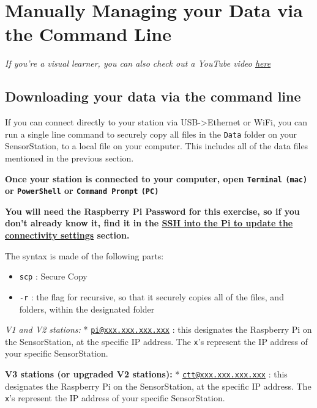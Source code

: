 \documentclass[
]{article}
\providecommand{\tightlist}{%
  \setlength{\itemsep}{0pt}\setlength{\parskip}{0pt}}
\begin{document}
\hypertarget{manually-managing-your-data-via-the-command-line}{%
\section{Manually Managing your Data via the Command
Line}\label{manually-managing-your-data-via-the-command-line}}

\emph{If you're a visual learner, you can also check out a YouTube video
\href{https://www.youtube.com/watch?v=2iG8ZG1UZGA\&t=23s}{here}}

\hypertarget{downloading-your-data-via-the-command-line}{%
\subsection{Downloading your data via the command
line}\label{downloading-your-data-via-the-command-line}}

If you can connect directly to your station via
USB-\textgreater Ethernet or WiFi, you can run a single line command to
securely copy all files in the \texttt{Data} folder on your
SensorStation, to a local file on your computer. This includes all of
the data files mentioned in the previous section.

\textbf{Once your station is connected to your computer, open
\texttt{Terminal} \texttt{(mac)} or \texttt{PowerShell} or
\texttt{Command\ Prompt} \texttt{(PC)}}

\textbf{You will need the Raspberry Pi Password for this exercise, so if
you don't already know it, find it in the
\protect\hyperlink{ssh-into-the-pi-to-update-the-connectivity-settings}{SSH
into the Pi to update the connectivity settings} section.}

The syntax is made of the following parts:

\begin{itemize}
\tightlist
\item
  \texttt{scp} : Secure Copy
\item
  \texttt{-r} : the flag for recursive, so that it securely copies all
  of the files, and folders, within the designated folder
\end{itemize}

\emph{V1 and V2 stations:} *
\href{mailto:pi@xxx.xxx.xxx.xxx}{\nolinkurl{pi@xxx.xxx.xxx.xxx}} : this
designates the Raspberry Pi on the SensorStation, at the specific IP
address. The \texttt{x}'s represent the IP address of your specific
SensorStation.

\textbf{V3 stations (or upgraded V2 stations):} *
\href{mailto:ctt@xxx.xxx.xxx.xxx}{\nolinkurl{ctt@xxx.xxx.xxx.xxx}} :
this designates the Raspberry Pi on the SensorStation, at the specific
IP address. The \texttt{x}'s represent the IP address of your specific
SensorStation.
\end{document}
